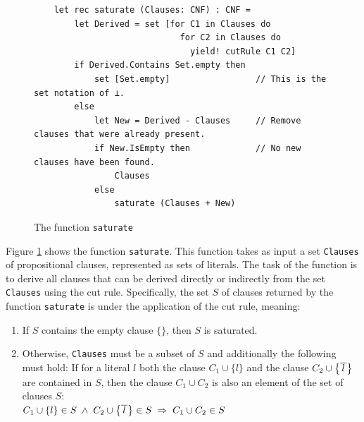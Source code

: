 \begin{figure}[!ht]
\centering
\begin{verbatim}
    let rec saturate (Clauses: CNF) : CNF =
        let Derived = set [for C1 in Clauses do
                             for C2 in Clauses do
                               yield! cutRule C1 C2]
        if Derived.Contains Set.empty then
            set [Set.empty]                 // This is the set notation of ⊥.
        else
            let New = Derived - Clauses     // Remove clauses that were already present.
            if New.IsEmpty then             // No new clauses have been found.
                Clauses
            else
                saturate (Clauses + New)
\end{verbatim}
\vspace*{-0.3cm}
\caption{The function \texttt{saturate}}
\label{fig:Completeness.ipynb-2}
\end{figure}
Figure \ref{fig:Completeness.ipynb-2} shows the function \texttt{saturate}. This function takes
as input a set \texttt{Clauses} of propositional clauses, represented as sets of literals.
The task of the function is to derive all clauses that can be derived directly or indirectly from the set \texttt{Clauses}
using the cut rule. Specifically, the set $S$ of clauses returned by the function \texttt{saturate}
is  under the application of the cut rule, meaning:

\begin{enumerate}
\item If $S$ contains the empty clause $\{\}$, then $S$ is saturated.
\item Otherwise, \texttt{Clauses} must be a subset of $S$ and additionally the following must hold:
      If for a literal $l$ both the clause $C_1 \cup \{ l \}$ and the clause $C_2 \cup
      \bigl\{ \overline{\,l\,} \bigr\}$ are contained in $S$,
      then the clause $C_1 \cup C_2$ is also an element of the set of clauses $S$:
      \\[0.2cm]
      \hspace*{1.3cm}
      $C_1 \cup \{ l \} \in S \;\wedge\; C_2 \cup \bigl\{ \overline{\,l\,} \bigr\} \in S \;\Rightarrow\; C_1 \cup C_2 \in S$
\end{enumerate}

